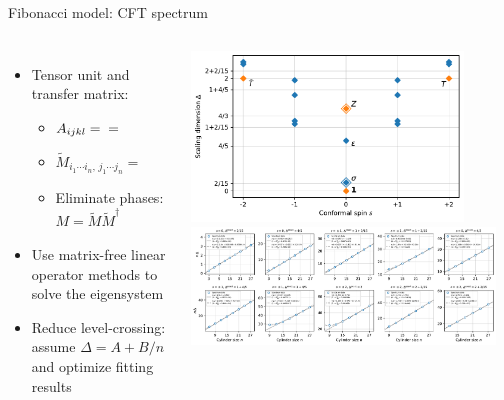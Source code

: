 \documentclass{fdubeamer}
\newcommand{\tikzinput}[1]{}
\newcommand{\1}{\mathbb{1}}
\begin{document}
\begin{frame}{Fibonacci model: CFT spectrum}

\begin{columns}[T]


    \begin{itemize}
      \item Tensor unit and transfer matrix:

        \begin{itemize}
          \item
            \begingroup
              \tikzset{x=0.6em, y=0.6em, node font=\tiny}
              $
                  A_{ijkl}
                = \raisebox{0.4em}{\tikzinput{fibonacci/square-1}}
                = {\fontsize{0.6em}{1em}\selectfont \tikzinput{fibonacci/square-2}}
              $
            \endgroup
          \item
            \begingroup
              \tikzset{x=0.8em, y=0.8em, node font=\tiny}
              $\tilde{M}_{i_1 \cdots i_n, \, j_1 \cdots j_n} = \tikzinput{fibonacci/cylinder}$
            \endgroup
          \item Eliminate phases: $M = \tilde{M}\tilde{M}^\dagger$
        \end{itemize}

      \item Use matrix-free linear operator methods to solve the eigensystem
      \item Reduce level-crossing: assume $\Delta=A+B/n$ and optimize fitting results
    \end{itemize}


    \centering
    \includegraphics[width=0.85\textwidth]{images/fibonacci/fib-spectrum.pdf} \\[1ex]
    \includegraphics[width=0.95\textwidth]{images/fibonacci/fib-fitting.pdf}


\end{columns}
\end{frame}
\end{document}
